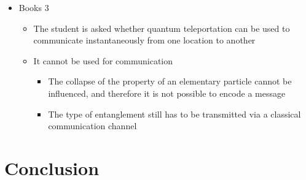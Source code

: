 \documentclass[11pt,twoside]{report} %
\begin{document}
\begin{itemize}
\begin{itemize}
	\end{itemize}
	\item Books 3
	\begin{itemize}
		\item The student is asked whether quantum teleportation can be used to communicate instantaneously from one location to another
		\item It cannot be used for communication
		\begin{itemize}
			\item The collapse of the property of an elementary particle cannot be influenced, and therefore it is not possible to encode a message
			\item The type of entanglement still has to be transmitted via a classical communication channel
		\end{itemize}
	\end{itemize}
\end{itemize}

\section{Conclusion}
\end{document}
